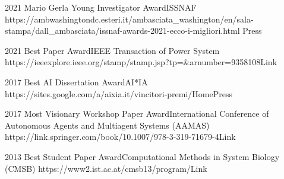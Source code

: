 \begin{awards}
	\awardentry
	{2021}
	{Mario Gerla Young Investigator Award}{ISSNAF}
	{https://ambwashingtondc.esteri.it/ambasciata_washington/en/sala-stampa/dall_ambasciata/issnaf-awards-2021-ecco-i-migliori.html}
	{Press}

	\awardentry
	{2021}
	{Best Paper Award}{IEEE Transaction of Power System}
	{https://ieeexplore.ieee.org/stamp/stamp.jsp?tp=\&arnumber=9358108}{Link}

	\awardentry
	{2017}
	{Best AI Dissertation Award}{AI*IA} %
	{https://sites.google.com/a/aixia.it/vincitori-premi/Home}{Press}

	\awardentry
	{2017}
	{Most Visionary Workshop Paper Award}{International Conference of 
	Autonomous Agents and Multiagent Systems (AAMAS)}
   {https://link.springer.com/book/10.1007/978-3-319-71679-4}{Link}

	\awardentry
	{2013}
	{Best Student Paper Award}{Computational Methods in System Biology (CMSB)}
	{https://www2.ist.ac.at/cmsb13/program/}{Link}

\end{awards}



